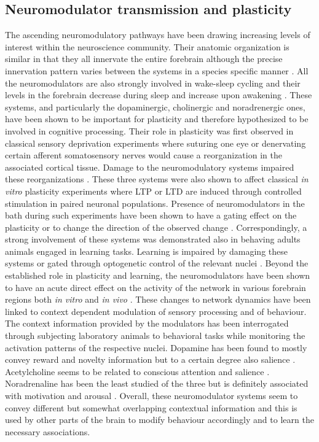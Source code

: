     \subsection{Neuromodulator transmission and plasticity}
    The ascending neuromodulatory pathways have been drawing increasing levels of interest within the neuroscience community. Their anatomic organization is similar in that they all innervate the entire forebrain although the precise innervation pattern varies between the systems in a species specific manner \cite{gu2002neuromodulatory}. All the neuromodulators are also strongly involved in wake-sleep cycling and their levels in the forebrain decrease during sleep and increase upon awakening \cite{saper2005hypothalamic}. These systems, and particularly the dopaminergic, cholinergic and noradrenergic ones, have been shown to be important for plasticity and therefore hypothesized to be involved in cognitive processing. Their role in plasticity was first observed in classical sensory deprivation experiments where suturing one eye or denervating certain afferent somatosensory nerves would cause a reorganization in the associated cortical tissue. Damage to the neuromodulatory systems impaired these reorganizations \cite{gu2002neuromodulatory}. These three systems were also shown to affect classical \textit{in vitro} plasticity experiments where LTP or LTD are induced through controlled stimulation in paired neuronal populations. Presence of neuromodulators in the bath during such experiments have been shown to have a gating effect on the plasticity or to change the direction of the observed change \cite{zhang2009gain,yagishita2014critical,huang2012pull,otani2015dopaminergic,isaac2009hippocampal}. Correspondingly, a strong involvement of these systems was demonstrated also in behaving adults animals engaged in learning tasks. Learning is impaired by damaging these systems or gated through optogenetic control of the relevant nuclei \cite{tsai2009phasic,ogren1980evidence,hasselmo2006role}. Beyond the established role in plasticity and learning, the neuromodulators have been shown to have an acute direct effect on the activity of the network in various forebrain regions both \textit{in vitro} \cite{eytan2004dopamine,kaufman2012long,otani1998dopamine,gu2002neuromodulatory} and \textit{in vivo} \cite{tye2013dopamine,carter2010tuning,kuchibhotla2017parallel}. These changes to network dynamics have been linked to context dependent modulation of sensory processing and of behaviour. The context information provided by the modulators has been interrogated through subjecting laboratory animals to behavioral tasks while monitoring the activation patterns of the respective nuclei. Dopamine has been found to mostly convey reward and novelty information but to a certain degree also salience \cite{schultz2013updating,bromberg2010dopamine}. Acetylcholine seems to be related to conscious attention and salience \cite{pinto2013fast}. Noradrenaline has been the least studied of the three but is definitely associated with motivation and arousal \cite{carter2010tuning}. Overall, these neuromodulator systems seem to convey different but somewhat overlapping contextual information and this is used by other parts of the brain to modify behaviour accordingly and to learn the necessary associations.

